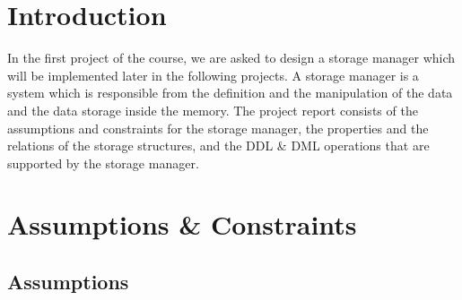 \documentclass[12pt]{article}
\begin{document}
\tableofcontents
\clearpage

\section{\large Introduction}
In the first project of the course, we are asked to design a storage manager which will be implemented later in the following projects. A storage manager is a system which is responsible from the definition and the manipulation of the data and the data storage inside the memory.
The project report consists of the assumptions and constraints for the storage manager, the properties and the relations of the storage structures, and the DDL \& DML operations that are supported by the storage manager.

\clearpage

\section{\large Assumptions \& Constraints}
\subsection{Assumptions}
\end{document}
